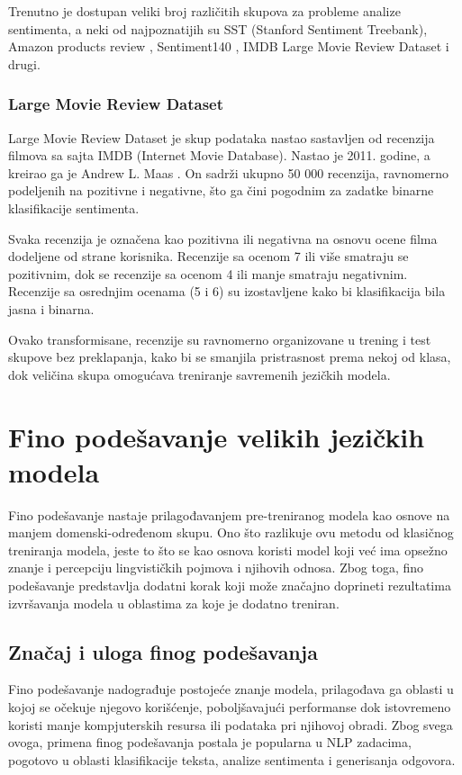 \documentclass[12pt,oneside]{memoir}
\begin{document}
Trenutno je dostupan veliki broj različitih skupova za probleme analize sentimenta, a neki od najpoznatijih su SST (Stanford Sentiment Treebank)\cite{SSTDataset}, Amazon products review \cite{AmazonDataset}, Sentiment140 \cite{Sentiment140Dataset}, IMDB Large Movie Review Dataset \cite{IMDBDataset} i drugi.


\subsection{Large Movie Review Dataset}
Large Movie Review Dataset je skup podataka nastao sastavljen od recenzija filmova sa sajta IMDB (Internet Movie Database). Nastao je 2011. godine, a kreirao ga je Andrew L. Maas \cite{IMDBDataset}. On sadrži ukupno 50 000 recenzija, ravnomerno podeljenih na pozitivne i negativne, što ga čini pogodnim za zadatke binarne klasifikacije sentimenta.

Svaka recenzija je označena kao pozitivna ili negativna na osnovu ocene filma dodeljene od strane korisnika. Recenzije sa ocenom 7 ili više smatraju se pozitivnim, dok se recenzije sa ocenom 4 ili manje smatraju negativnim. Recenzije sa osrednjim ocenama (5 i 6) su izostavljene kako bi klasifikacija bila jasna i binarna.

Ovako transformisane, recenzije su ravnomerno organizovane u trening i test skupove bez preklapanja, kako bi se smanjila pristrasnost prema nekoj od klasa, dok veličina skupa omogućava treniranje savremenih jezičkih modela.


\chapter{Fino podešavanje velikih jezičkih modela}
Fino podešavanje nastaje prilagođavanjem pre-treniranog modela kao osnove na manjem domenski-određenom skupu. Ono što razlikuje ovu metodu od klasičnog treniranja modela, jeste to što se kao osnova koristi model koji već ima opsežno znanje i percepciju lingvističkih pojmova i njihovih odnosa. Zbog toga, fino podešavanje predstavlja dodatni korak koji može značajno doprineti rezultatima izvršavanja modela u oblastima za koje je dodatno treniran.

\section{Značaj i uloga finog podešavanja}
Fino podešavanje nadograđuje postojeće znanje modela, prilagođava ga oblasti u kojoj se očekuje njegovo korišćenje, poboljšavajući performanse dok istovremeno koristi manje kompjuterskih resursa ili podataka pri njihovoj obradi. Zbog svega ovoga, primena finog podešavanja postala je popularna u NLP zadacima, pogotovo u oblasti klasifikacije teksta, analize sentimenta i generisanja odgovora. 
\end{document}
